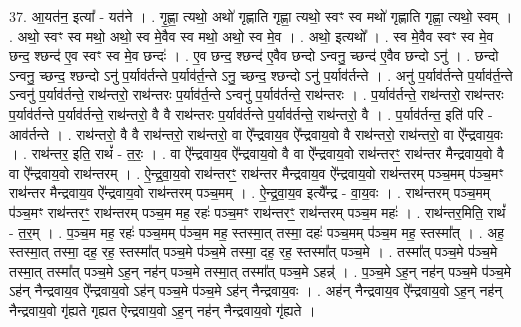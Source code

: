 \documentclass[17pt]{extarticle}
\begin{document}
37. आ॒यत॑न॒ इत्या᳚ - यत॑ने । . गृ॒ह्णा॒ त्यथो॒ अथो॑ गृह्णाति गृह्णा॒ त्यथो॒ स्वꣳ स्व मथो॑ गृह्णाति गृह्णा॒ त्यथो॒ स्वम् । . अथो॒ स्वꣳ स्व मथो॒ अथो॒ स्व मे॒वैव स्व मथो॒ अथो॒ स्व मे॒व । . अथो॒ इत्यथो᳚ । . स्व मे॒वैव स्वꣳ स्व मे॒व छन्द॒ श्छन्द॑ ए॒व स्वꣳ स्व मे॒व छन्दः॑ । . ए॒व छन्द॒ श्छन्द॑ ए॒वैव छन्दो ऽन्वनु॒ च्छन्द॑ ए॒वैव छन्दो ऽनु॑ । . छन्दो ऽन्वनु॒ च्छन्द॒ श्छन्दो ऽनु॑ प॒र्याव॑र्तन्ते प॒र्याव॑र्त॒न्ते ऽनु॒ च्छन्द॒ श्छन्दो ऽनु॑ प॒र्याव॑र्तन्ते । . अनु॑ प॒र्याव॑र्तन्ते प॒र्याव॑र्त॒न्ते ऽन्वनु॑ प॒र्याव॑र्तन्ते॒ राथ॑न्तरो॒ राथ॑न्तरः प॒र्याव॑र्त॒न्ते ऽन्वनु॑ प॒र्याव॑र्तन्ते॒ राथ॑न्तरः । . प॒र्याव॑र्तन्ते॒ राथ॑न्तरो॒ राथ॑न्तरः प॒र्याव॑र्तन्ते प॒र्याव॑र्तन्ते॒ राथ॑न्तरो॒ वै वै राथ॑न्तरः प॒र्याव॑र्तन्ते प॒र्याव॑र्तन्ते॒ राथ॑न्तरो॒ वै । . प॒र्याव॑र्तन्त॒ इति॑ परि - आव॑र्तन्ते । . राथ॑न्तरो॒ वै वै राथ॑न्तरो॒ राथ॑न्तरो॒ वा ऐ᳚न्द्रवाय॒व ऐ᳚न्द्रवाय॒वो वै राथ॑न्तरो॒ राथ॑न्तरो॒ वा ऐ᳚न्द्रवाय॒वः । . राथ॑न्तर॒ इति॒ राथं᳚ - त॒रः॒ । . वा ऐ᳚न्द्रवाय॒व ऐ᳚न्द्रवाय॒वो वै वा ऐ᳚न्द्रवाय॒वो राथ॑न्तरꣳ॒॒ राथ॑न्तर मैन्द्रवाय॒वो वै वा ऐ᳚न्द्रवाय॒वो राथ॑न्तरम् । . ऐ॒न्द्र॒वा॒य॒वो राथ॑न्तरꣳ॒॒ राथ॑न्तर मैन्द्रवाय॒व ऐ᳚न्द्रवाय॒वो राथ॑न्तरम् पञ्च॒मम् प॑ञ्च॒मꣳ राथ॑न्तर मैन्द्रवाय॒व ऐ᳚न्द्रवाय॒वो राथ॑न्तरम् पञ्च॒मम् । . ऐ॒न्द्र॒वा॒य॒व इत्यै᳚न्द्र - वा॒य॒वः । . राथ॑न्तरम् पञ्च॒मम् प॑ञ्च॒मꣳ राथ॑न्तरꣳ॒॒ राथ॑न्तरम् पञ्च॒म मह॒ रहः॑ पञ्च॒मꣳ राथ॑न्तरꣳ॒॒ राथ॑न्तरम् पञ्च॒म महः॑ । . राथ॑न्तर॒मिति॒ राथं᳚ - त॒र॒म् । . प॒ञ्च॒म मह॒ रहः॑ पञ्च॒मम् प॑ञ्च॒म मह॒ स्तस्मा॒त् तस्मा॒ दहः॑ पञ्च॒मम् प॑ञ्च॒म मह॒ स्तस्मा᳚त् । . अह॒ स्तस्मा॒त् तस्मा॒ दह॒ रह॒ स्तस्मा᳚त् पञ्च॒मे प॑ञ्च॒मे तस्मा॒ दह॒ रह॒ स्तस्मा᳚त् पञ्च॒मे । . तस्मा᳚त् पञ्च॒मे प॑ञ्च॒मे तस्मा॒त् तस्मा᳚त् पञ्च॒मे ऽह॒न् नह॑न् पञ्च॒मे तस्मा॒त् तस्मा᳚त् पञ्च॒मे ऽहन्न्॑ । . प॒ञ्च॒मे ऽह॒न् नह॑न् पञ्च॒मे प॑ञ्च॒मे ऽह॑न् नैन्द्रवाय॒व ऐ᳚न्द्रवाय॒वो ऽह॑न् पञ्च॒मे प॑ञ्च॒मे ऽह॑न् नैन्द्रवाय॒वः । . अह॑न् नैन्द्रवाय॒व ऐ᳚न्द्रवाय॒वो ऽह॒न् नह॑न् नैन्द्रवाय॒वो गृ॑ह्यते गृह्यत ऐन्द्रवाय॒वो ऽह॒न् नह॑न् नैन्द्रवाय॒वो गृ॑ह्यते । \newline
\pagebreak
{}
\end{document}

